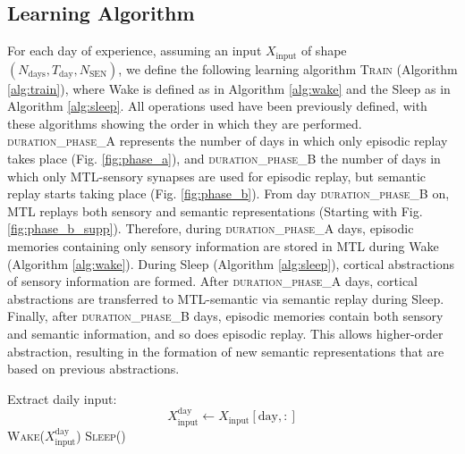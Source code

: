 \documentclass{article}
\begin{document}
\subsection*{Learning Algorithm}
For each day of experience, assuming an input $X_\textrm{input}$ of shape $(N_\textrm{days}, T_\textrm{day}, N_\textrm{SEN})$, we define the following learning algorithm \textsc{Train} (Algorithm \ref{alg:train}), where \textrm{Wake} is defined as in Algorithm \ref{alg:wake} and the \textrm{Sleep} as in Algorithm \ref{alg:sleep}. All operations used have been previously defined, with these algorithms showing the order in which they are performed. \textsc{duration\_phase\_A} represents the number of days in which only episodic replay takes place (Fig. \ref{fig:phase_a}), and  \textsc{duration\_phase\_B} the number of days in which only MTL-sensory synapses are used for episodic replay, but semantic replay starts taking place (Fig. \ref{fig:phase_b}). From day \textsc{duration\_phase\_B} on, MTL replays both sensory and semantic representations (Starting with Fig. \ref{fig:phase_b_supp}). Therefore, during \textsc{duration\_phase\_A} days, episodic memories containing only sensory information are stored in MTL during Wake (Algorithm \ref{alg:wake}). During Sleep (Algorithm \ref{alg:sleep}), cortical abstractions of sensory information are formed. After \textsc{duration\_phase\_A} days, cortical abstractions are transferred to MTL-semantic via semantic replay during Sleep. Finally, after \textsc{duration\_phase\_B} days, episodic memories contain both sensory and semantic information, and so does episodic replay. This allows higher-order abstraction, resulting in the formation of new semantic representations that are based on previous abstractions.
\begin{algorithm}[h!]
\caption{Learning Algorithm Across Days}\label{alg:train}
\begin{algorithmic}[1]
        \State Extract daily input:
            \[
            X^{\textrm{day}}_\textrm{input} \gets X_\textrm{input}[\textrm{day},:]
            \]
        \State \textsc{Wake}($X^{\textrm{day}}_\textrm{input}$)
        \State \textsc{Sleep}()
    \EndFor
\EndFunction
\end{algorithmic}
\end{algorithm}
\end{document}
